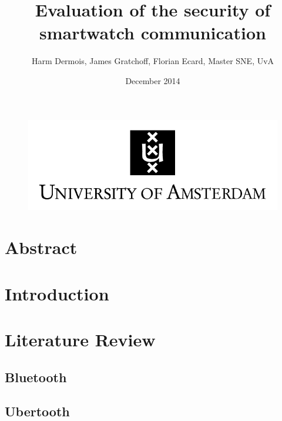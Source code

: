 \documentclass{article}
\begin{document}
 



\begin{figure}[!h]
 	\begin{center}
		\huge \title{Evaluation of the security of smartwatch communication}
		\author{Harm Dermois, James Gratchoff, Florian Ecard,  Master SNE, UvA} 
		\date{December 2014\\}
	\maketitle 
		\includegraphics{uva.jpeg}
		\label{sec:uva}
	\end{center}
\end{figure}

\newpage
\section*{Abstract}

\newpage
\tableofcontents

\newpage

\newcommand{\pend}{
 \\ 
\indent}

\section{Introduction}
\newpage
\section{Literature Review}

	\subsection{Bluetooth}
	\subsection{Ubertooth}
\end{document}
